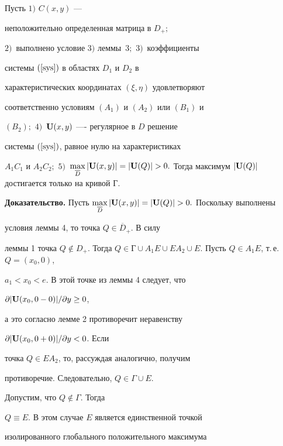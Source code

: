 \begin{thm}


Пусть $1)$ $C(x,y)$ ---


неположительно определенная матрица в $D_+;$


$2)$~выполнено условие $3)$ леммы~$3;$ $3)$~коэффициенты


системы $(\ref{sys})$ в областях $D_1$ и $D_2$ в


характеристических координатах $(\xi,\eta)$ удовлетворяют


соответственно условиям $(A_1)$ и $(A_2)$ или $(B_1)$ и


$(B_2);$ $4)$~${\bold U}(x,y)$ ---- регулярное в $D$ решение


системы $(\ref{sys})$, равное нулю на характеристиках


$A_1C_1$ и $A_2C_2;$ $5)$~$\max \limits_{\overline D}


|{\bold U}(x,y)|=|{\bold U}(Q)|>0.$ Тогда максимум $|{\bold


U}(Q)|$ достигается только на кривой $Г$.


\end{thm}





{\bf Доказательство.} Пусть $\max \limits_{\overline D}


|{\bold U}(x,y)|=|{\bold U}(Q)|>0.$ Поскольку выполнены


условия леммы 4, то точка $Q\in\overline D_+$. В силу


леммы 1 точка $Q\notin D_+$. Тогда $Q\in Г\cup A_1E\cup


EA_2\cup E$. Пусть $Q\in A_1E$, т.\,е. $Q=(x_0,0)$,


$a_1<x_0<e$. В этой точке из леммы 4 следует, что


${\partial |{\bold U}(x_0,0-0)|}/{\partial y}\ge 0$,


а это согласно лемме 2 противоречит неравенству


${\partial |{\bold U}(x_0,0+0)|}/{\partial y}< 0$. Если


точка $Q\in EA_2$, то, рассуждая аналогично, получим


противоречие. Следовательно, $Q\in\Gamma\cup E$.


Допустим, что $Q\notin\Gamma$. Тогда


$Q\equiv E$. В этом случае $E$ является единственной точкой


изолированного глобального положительного максимума


